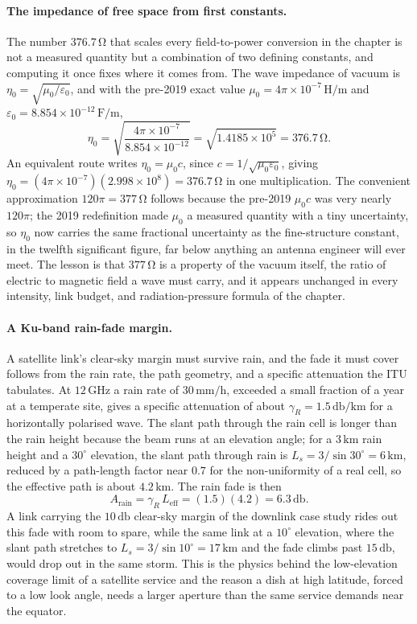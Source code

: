 \paragraph{The impedance of free space from first constants.}
The number $376.7\,\si{\ohm}$ that scales every field-to-power conversion
in the chapter is not a measured quantity but a combination of two defining
constants, and computing it once fixes where it comes from. The wave
impedance of vacuum is $\eta_0 = \sqrt{\mu_0/\varepsilon_0}$, and with the
pre-2019 exact value $\mu_0 = 4\pi\times 10^{-7}\,\si{\henry\per\meter}$
and $\varepsilon_0 = 8.854\times 10^{-12}\,\si{\farad\per\meter}$,
\[
\eta_0 = \sqrt{\frac{4\pi\times 10^{-7}}{8.854\times 10^{-12}}} =
\sqrt{1.4185\times 10^{5}} = 376.7\,\si{\ohm}.
\]
An equivalent route writes $\eta_0 = \mu_0 c$, since $c = 1/\sqrt{\mu_0
\varepsilon_0}$, giving $\eta_0 = (4\pi\times 10^{-7})(2.998\times 10^{8})
= 376.7\,\si{\ohm}$ in one multiplication. The convenient approximation
$120\pi = 377\,\si{\ohm}$ follows because the pre-2019 $\mu_0 c$ was very
nearly $120\pi$; the 2019 redefinition made $\mu_0$ a measured quantity
with a tiny uncertainty, so $\eta_0$ now carries the same fractional
uncertainty as the fine-structure constant, in the twelfth significant
figure, far below anything an antenna engineer will ever meet. The lesson
is that $377\,\si{\ohm}$ is a property of the vacuum itself, the ratio of
electric to magnetic field a wave must carry, and it appears unchanged in
every intensity, link budget, and radiation-pressure formula of the
chapter.

\paragraph{A Ku-band rain-fade margin.}
A satellite link's clear-sky margin must survive rain, and the fade it must
cover follows from the rain rate, the path geometry, and a specific
attenuation the ITU tabulates. At $12\,\si{\giga\hertz}$ a rain rate of
$30\,\si{\milli\meter\per\hour}$, exceeded a small fraction of a year at a
temperate site, gives a specific attenuation of about $\gamma_R =
1.5\,\si{\decibel\per\kilo\meter}$ for a horizontally polarised wave. The
slant path through the rain cell is longer than the rain height because the
beam runs at an elevation angle; for a $3\,\si{\kilo\meter}$ rain height and
a $30^{\circ}$ elevation, the slant path through rain is $L_s = 3/\sin
30^{\circ} = 6\,\si{\kilo\meter}$, reduced by a path-length factor near
$0.7$ for the non-uniformity of a real cell, so the effective path is about
$4.2\,\si{\kilo\meter}$. The rain fade is then
\[
A_{\text{rain}} = \gamma_R\,L_{\text{eff}} = (1.5)(4.2) = 6.3\,\si{
\decibel}.
\]
A link carrying the $10\,\si{\decibel}$ clear-sky margin of the downlink
case study rides out this fade with room to spare, while the same link at
a $10^{\circ}$ elevation, where the slant path stretches to $L_s = 3/\sin
10^{\circ} = 17\,\si{\kilo\meter}$ and the fade climbs past
$15\,\si{\decibel}$, would drop out in the same storm. This is the physics
behind the low-elevation coverage limit of a satellite service and the
reason a dish at high latitude, forced to a low look angle, needs a larger
aperture than the same service demands near the equator.

